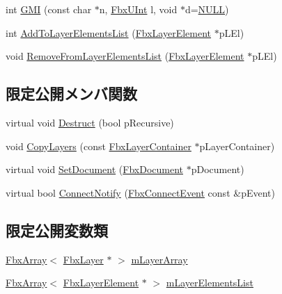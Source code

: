 \begin{DoxyCompactItemize}
\item 
int \hyperlink{class_fbx_layer_container_a53555220e17a982099d63915e21b4d2e}{G\+MI} (const char $\ast$n, \hyperlink{fbxtypes_8h_ae9fb141d8158a730aa85ec5ff2ea3f6b}{Fbx\+U\+Int} l, void $\ast$d=\hyperlink{fbxarch_8h_a070d2ce7b6bb7e5c05602aa8c308d0c4}{N\+U\+LL})
\item 
int \hyperlink{class_fbx_layer_container_abceae8ff9bf083667013f1ec101d04ce}{Add\+To\+Layer\+Elements\+List} (\hyperlink{class_fbx_layer_element}{Fbx\+Layer\+Element} $\ast$p\+L\+El)
\item 
void \hyperlink{class_fbx_layer_container_a2202d8a3b1d6a442cd0424bfcd25aebe}{Remove\+From\+Layer\+Elements\+List} (\hyperlink{class_fbx_layer_element}{Fbx\+Layer\+Element} $\ast$p\+L\+El)
\end{DoxyCompactItemize}
\subsection*{限定公開メンバ関数}
\begin{DoxyCompactItemize}
\item 
virtual void \hyperlink{class_fbx_layer_container_aefb90aadf569c7ebbbd3672e9c45776f}{Destruct} (bool p\+Recursive)
\item 
void \hyperlink{class_fbx_layer_container_af17d86b9cd7dc836a7baf86f7292fcb2}{Copy\+Layers} (const \hyperlink{class_fbx_layer_container}{Fbx\+Layer\+Container} $\ast$p\+Layer\+Container)
\item 
virtual void \hyperlink{class_fbx_layer_container_a1743b1727b9f522d69bbf0d65c2a5073}{Set\+Document} (\hyperlink{class_fbx_document}{Fbx\+Document} $\ast$p\+Document)
\item 
virtual bool \hyperlink{class_fbx_layer_container_a7fe50204f62a2d4db056cc730c1eba18}{Connect\+Notify} (\hyperlink{class_fbx_connect_event}{Fbx\+Connect\+Event} const \&p\+Event)
\end{DoxyCompactItemize}
\subsection*{限定公開変数類}
\begin{DoxyCompactItemize}
\item 
\hyperlink{class_fbx_array}{Fbx\+Array}$<$ \hyperlink{class_fbx_layer}{Fbx\+Layer} $\ast$ $>$ \hyperlink{class_fbx_layer_container_afb0f4b99b62fcfa0203831995dc4e274}{m\+Layer\+Array}
\item 
\hyperlink{class_fbx_array}{Fbx\+Array}$<$ \hyperlink{class_fbx_layer_element}{Fbx\+Layer\+Element} $\ast$ $>$ \hyperlink{class_fbx_layer_container_a7f935eeb2435e0b3cfa69bd1b54b5c11}{m\+Layer\+Elements\+List}
\end{DoxyCompactItemize}
